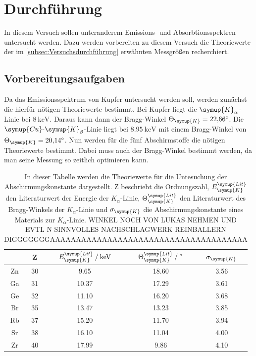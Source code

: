 \section{Durchführung}
\label{sec:Durchführung}
In diesem Versuch sollen unteranderem Emissions- und Absorbtionsspektren untersucht werden. Dazu werden vorbereiten 
zu diesem Versuch die Theoriewerte der im \autoref{subsec:Versuchsdurchführung} erwähnten Messgrößen recherchiert.
\subsection{Vorbereitungsaufgaben}
\label{subsec:vorbereitung}
Da das Emissionsspektrum von Kupfer untersucht werden soll, werden zunächst die hierfür nötigen Theoriewerte bestimmt.
Bei Kupfer liegt die $\symup{K}_\alpha$-Linie bei $\qty{8}{\kilo\electronvolt}$. Daraus kann dann der Bragg-Winkel $\Theta_{\symup{K}} = \qty{22.66}{\degree}$. 
Die $\symup{Cu}\text{-}\symup{K}_{\beta}$-Linie liegt bei $\qty{8.95}{\kilo\electronvolt}$ mit einem Bragg-Winkel von $\Theta_{\symup{K}} = \qty{20.14}{\degree}$.
Nun werden für die fünf Abschirmstoffe die nötigen Theoriewerte bestimmt. Dabei muss auch der Bragg-Winkel bestimmt werden, da man seine Messung so zeitlich optimieren kann.
\begin{table}
    \centering
    \caption{In dieser Tabelle werden die Theoriewerte für die Untesuchung der Abschirmungskonstante dargestellt. Z beschriebt die Ordnungszahl, 
    $E_{\symup{K}}^{\symup{Lit}}$ den Literaturwert der Energie der $K_\alpha$-Linie, $\Theta_{\symup{K}}^{\symup{Lit}}$ den Literaturwert des Bragg-Winkels der $K_\alpha$-Linie
    und $\sigma_{\symup{K}}$ die Abschirmungskonstante eines Materials zur $K_\alpha$-Linie. WINKEL NOCH VON LUKAS NEHMEN UND EVTL N SINNVOLLES NACHSCHLAGWERK REINBALLERN DIGGGGGGGAAAAAAAAAAAAAAAAAAAAAAAAAAAAAAAAAAAAAA}
    \label{tab:vorbereitung}
    \begin{tabular}{c c S S S}
        \toprule
         & Z & {$E_{\symup{K}}^{\symup{Lit}} \mathbin{/} \unit{\kilo\electronvolt}$} & {$\Theta_{\symup{K}}^{\symup{Lit}} \mathbin{/} \unit{\degree}$} & {$\sigma_{\symup{K}}$} \\
        \midrule
        Zn & 30 &  9.65 & 18.60 & 3.56 \\
        Ga & 31 & 10.37 & 17.29 & 3.61 \\
        Ge & 32 & 11.10 & 16.20 & 3.68 \\
        Br & 35 & 13.47 & 13.23 & 3.85 \\
        Rb & 37 & 15.20 & 11.70 & 3.94 \\
        Sr & 38 & 16.10 & 11.04 & 4.00 \\
        Zr & 40 & 17.99 &  9.86 & 4.10 \\
    \bottomrule
    \end{tabular}
\end{table}

